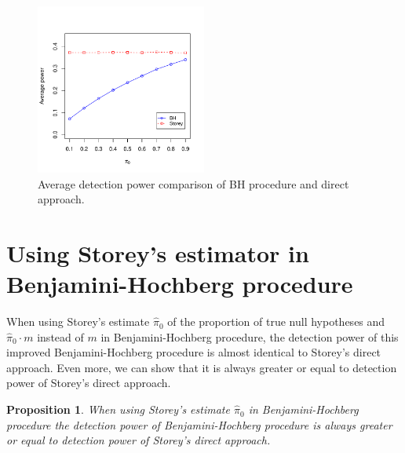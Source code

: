 \documentclass[10pt]{article}
\newtheorem{proposition}[theorem]{Proposition}
\begin{document}
\begin{figure}[H]
	\centering
	\includegraphics[width=0.5\textwidth]{../data/power.pdf}
	\caption{Average detection power comparison of BH procedure and direct approach.}
	\label{fig: power}	
\end{figure}

\section{Using Storey's estimator in Benjamini-Hochberg procedure} \label{sec: 2nd}

When using Storey's estimate $\widehat{\pi}_{0}$ of the proportion of true null hypotheses and $\widehat{\pi}_{0} \cdot m$ instead of $m$ in Benjamini-Hochberg procedure, the detection power of this improved Benjamini-Hochberg procedure is almost identical to Storey's direct approach. Even more, we can show that it is always greater or equal to detection power of Storey's direct approach.

\begin{proposition}
When using Storey's estimate $\widehat{\pi}_{0}$ in Benjamini-Hochberg procedure the detection power of Benjamini-Hochberg procedure is always greater or equal to detection power of Storey's direct approach.
\end{proposition}
\end{document}
